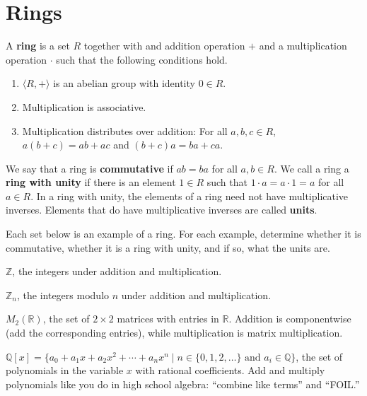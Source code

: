 \section{Rings}

\begin{definition}
A \textbf{ring} is a set \(R\) together with and addition operation \(+\) and a multiplication operation \(\cdot\) such that the following conditions hold.
\begin{enumerate}
  \item \(\langle  R, + \rangle \) is an abelian group with identity \(0 \in R\).
  \item Multiplication is associative.
  \item Multiplication distributes over addition: For all \(a,b,c\in R\), \(a(b+c)=ab+ac\) and \((b+c)a=ba+ca\).
\end{enumerate}
\end{definition}

We say that a ring is \textbf{commutative} if \(ab = ba\) for all \(a,b\in R\).
We call a ring a \textbf{ring with unity} if there is an element \(1\in R\) such that \(1\cdot a = a\cdot 1=a\) for all \(a\in R\).
In a ring with unity, the elements of a ring need not have multiplicative inverses. Elements that do have multiplicative inverses are called \textbf{units}.

\begin{problem}
Each set below is an example of a ring. For each example, determine whether it is commutative, whether it is a ring with unity, and if so, what the units are.
\begin{problemparts}
  \item \(\mathbb{Z}\), the integers under addition and multiplication.
  \item \(\mathbb{Z}_n\), the integers modulo \(n\) under addition and multiplication.
  \item \(M_2(\mathbb{R})\), the set of \(2\times 2\) matrices with entries in \(\mathbb{R}\). Addition is componentwise (add the corresponding entries), while multiplication is matrix multiplication.
  \item \(\mathbb{Q}[x]=\{a_0+a_1x+a_2x^2+\cdots+a_nx^n \mid n\in \{0,1,2,\ldots\}\mbox{ and } a_i\in \mathbb{Q}\}\), the set of polynomials in the variable \(x\) with rational coefficients. Add and multiply polynomials like you do in high school algebra: ``combine like terms'' and ``FOIL.''
\end{problemparts}
\end{problem}

